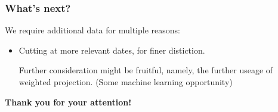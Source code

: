 \documentclass{beamer}
\begin{document}
\begin{frame}
\frametitle{What's next?}

We require additional data for multiple reasons:

\begin{itemize}

	\item Cutting at more relevant dates, for finer distiction.
	
\bigskip

Further consideration might be fruitful, namely, the further useage of weighted projection. (Some machine learning opportunity)

\end{itemize}
\end{frame}



\begin{frame}
\begin{center}
\Large{\textbf{Thank you for your attention!}}
\end{center}
\end{frame}
\end{document}
